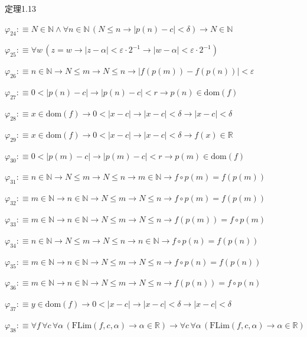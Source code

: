 \begin{fullproof}{定理1.13}
\begin{abbrevlist}
\item $\varphi_{24} :\equiv N \in \mathbb{N} \land \forall n \in \mathbb{N}\,(N \leq n \to \lvert p(n) - c \rvert < \delta) \to N \in \mathbb{N}$
\item $\varphi_{25} :\equiv \forall w\,(z = w \to \lvert z - \alpha \rvert < \varepsilon \cdot 2^{-1} \to \lvert w - \alpha \rvert < \varepsilon \cdot 2^{-1})$
\item $\varphi_{26} :\equiv n \in \mathbb{N} \to N \leq m \to N \leq n \to \lvert f(p(m)) - f(p(n)) \rvert < \varepsilon$
\item $\varphi_{27} :\equiv 0 < \lvert p(n) - c \rvert \to \lvert p(n) - c \rvert < r \to p(n) \in \mathrm{dom}(f)$
\item $\varphi_{28} :\equiv x \in \mathrm{dom}(f) \to 0 < \lvert x - c \rvert \to \lvert x - c \rvert < \delta \to \lvert x - c \rvert < \delta$
\item $\varphi_{29} :\equiv x \in \mathrm{dom}(f) \to 0 < \lvert x - c \rvert \to \lvert x - c \rvert < \delta \to f(x) \in \mathbb{R}$
\item $\varphi_{30} :\equiv 0 < \lvert p(m) - c \rvert \to \lvert p(m) - c \rvert < r \to p(m) \in \mathrm{dom}(f)$
\item $\varphi_{31} :\equiv n \in \mathbb{N} \to N \leq m \to N \leq n \to m \in \mathbb{N} \to f \circ p(m) = f(p(m))$
\item $\varphi_{32} :\equiv m \in \mathbb{N} \to n \in \mathbb{N} \to N \leq m \to N \leq n \to f \circ p(m) = f(p(m))$
\item $\varphi_{33} :\equiv m \in \mathbb{N} \to n \in \mathbb{N} \to N \leq m \to N \leq n \to f(p(m)) = f \circ p(m)$
\item $\varphi_{34} :\equiv n \in \mathbb{N} \to N \leq m \to N \leq n \to n \in \mathbb{N} \to f \circ p(n) = f(p(n))$
\item $\varphi_{35} :\equiv m \in \mathbb{N} \to n \in \mathbb{N} \to N \leq m \to N \leq n \to f \circ p(n) = f(p(n))$
\item $\varphi_{36} :\equiv m \in \mathbb{N} \to n \in \mathbb{N} \to N \leq m \to N \leq n \to f(p(n)) = f \circ p(n)$
\item $\varphi_{37} :\equiv y \in \mathrm{dom}(f) \to 0 < \lvert x - c \rvert \to \lvert x - c \rvert < \delta \to \lvert x - c \rvert < \delta$
\item $\varphi_{38} :\equiv \forall f\,\forall c\,\forall \alpha\,(\mathrm{FLim}(f,c,\alpha) \to \alpha \in \mathbb{R}) \to \forall c\,\forall \alpha\,(\mathrm{FLim}(f,c,\alpha) \to \alpha \in \mathbb{R})$

\end{abbrevlist}
\end{fullproof}
